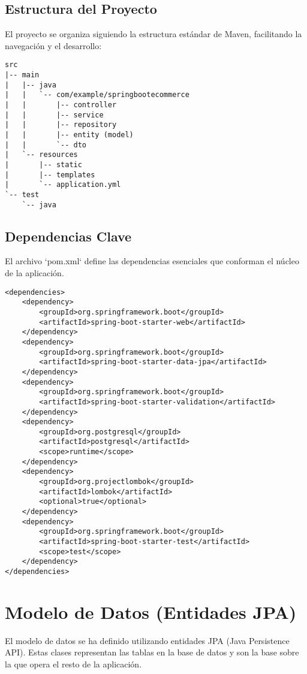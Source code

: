 \documentclass[12pt, a4paper]{article}
\begin{document}
\subsection{Estructura del Proyecto}
El proyecto se organiza siguiendo la estructura estándar de Maven, facilitando la navegación y el desarrollo:
\begin{verbatim}
src
|-- main
|   |-- java
|   |   `-- com/example/springbootecommerce
|   |       |-- controller
|   |       |-- service
|   |       |-- repository
|   |       |-- entity (model)
|   |       `-- dto
|   `-- resources
|       |-- static
|       |-- templates
|       `-- application.yml
`-- test
    `-- java
\end{verbatim}

\subsection{Dependencias Clave}
El archivo `pom.xml` define las dependencias esenciales que conforman el núcleo de la aplicación.
\begin{lstlisting}[style=xmlstyle, caption={Fragmento de dependencias en `pom.xml`}, label=lst:pom]
<dependencies>
    <dependency>
        <groupId>org.springframework.boot</groupId>
        <artifactId>spring-boot-starter-web</artifactId>
    </dependency>
    <dependency>
        <groupId>org.springframework.boot</groupId>
        <artifactId>spring-boot-starter-data-jpa</artifactId>
    </dependency>
    <dependency>
        <groupId>org.springframework.boot</groupId>
        <artifactId>spring-boot-starter-validation</artifactId>
    </dependency>
    <dependency>
        <groupId>org.postgresql</groupId>
        <artifactId>postgresql</artifactId>
        <scope>runtime</scope>
    </dependency>
    <dependency>
        <groupId>org.projectlombok</groupId>
        <artifactId>lombok</artifactId>
        <optional>true</optional>
    </dependency>
    <dependency>
        <groupId>org.springframework.boot</groupId>
        <artifactId>spring-boot-starter-test</artifactId>
        <scope>test</scope>
    </dependency>
</dependencies>
\end{lstlisting}

\section{Modelo de Datos (Entidades JPA)}
El modelo de datos se ha definido utilizando entidades JPA (Java Persistence API). Estas clases representan las tablas en la base de datos y son la base sobre la que opera el resto de la aplicación.
\end{document}
